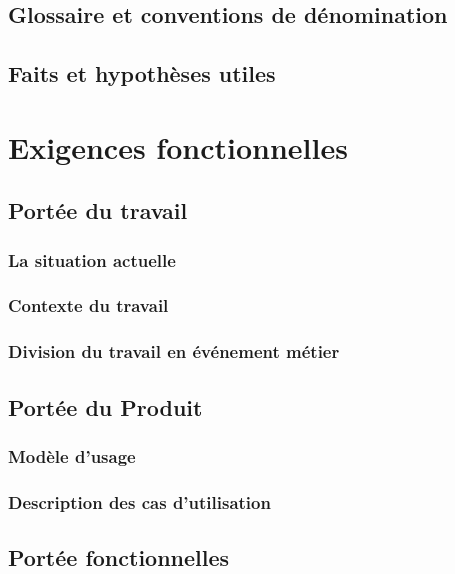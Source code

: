\documentclass[a4paper, 12pt, french]{report}
\begin{document}
		\section{Glossaire et conventions de dénomination}
			

		\section{Faits et hypothèses utiles}
			

	\chapter{Exigences fonctionnelles}
		\section{Portée du travail}
			\subsection{La situation actuelle}
				

			\subsection{Contexte du travail}
				

			\subsection{Division du travail en événement métier}
			\label{sub:divisionTravail}
				

		\section{Portée du Produit}
			\subsection{Modèle d'usage}
				
			\subsection{Description des cas d'utilisation}
				

		\section{Portée fonctionnelles}
				
\end{document}
